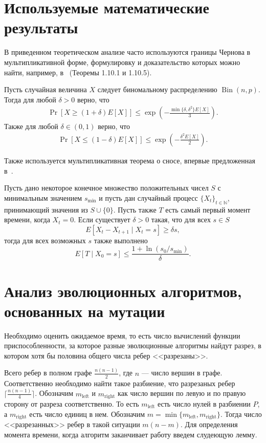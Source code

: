 \documentclass[times]{itmo-student-thesis}
\newcommand{\N}{{\mathbb N}}
\DeclareMathOperator{\Bin}{Bin}
\begin{document}
\section{Используемые математические результаты}

В приведенном теоретическом анализе часто используются границы Чернова в мультипликативной форме, формулировку и доказательство которых можно найти, например, в~\cite{Doerr20bookchapter} (Теоремы 1.10.1 и 1.10.5).

\begin{lemma}\label{lem:chernoff}
  Пусть случайная величина $X$ следует биномальному распределению $\Bin(n, p)$. Тогда для любой $\delta > 0$ верно, что
  \begin{align*}
    \Pr[X \ge (1 + \delta)E[X]] \le \exp\left(-\frac{\min\{\delta, \delta^2\}E[X]}{3}\right).
  \end{align*}
  Также для любой $\delta \in (0, 1)$ верно, что
  \begin{align*}
    \Pr[X \le (1 - \delta)E[X]] \le \exp\left(-\frac{\delta^2 E[X]}{2}\right).
  \end{align*}
\end{lemma}

Также используется мультипликативная теорема о сносе, впервые предложенная в~\cite{DoerrJW10}.

\begin{theorem}\label{thm:mult-drift}
  Пусть дано некоторое конечное множество положительных чисел $S$ с минимальным значением $s_{\min}$ и пусть дан случайный процесс $\{X_t\}_{t \in \N}$, принимающий значения из $S \cup \{0\}$. Пусть также $T$ есть самый первый момент времени, когда $X_t = 0$. Если существует $\delta > 0$ такая, что для всех $s \in S$
  \[
    E\left[X_t - X_{t + 1} \mid X_t = s\right] \ge \delta s,
  \]
  тогда для всех возможных $s$ также выполнено
  \[
    E[T \mid X_0 = s] \le \frac{1 + \ln(s_0/s_{\min})}{\delta}.
  \]
\end{theorem}

\section{Анализ эволюционных алгоритмов, основанных на мутации}
Необходимо оценить ожидаемое время, то есть число вычислений функции приспособленности, за которое разные эволюционные алгоритмы найдут разрез, в котором хотя бы половина общего числа ребер <<разрезаны>>.

Всего ребер в полном графе $\frac{n(n-1)}{2}$, где $n$ --- число вершин в графе.
Соответственно необходимо найти такое разбиение, что разрезаных ребер $\lceil \frac{n(n-1)}{4} \rceil$.
Обозначим $m_{\text{left}}$ и $m_{\text{right}}$ как число вершин по левую и по правую сторону от разреза соответственно. То есть $m_{\text{left}}$ есть число нулей в разбиении $P$, а $m_{\text{right}}$ есть число единиц в нем.
Обозначим $m = \min\{m_{\text{left}}, m_{\text{right}}\}$.
Тогда число <<разрезанных>> ребер в такой ситуации $m(n-m)$. Для определения момента времени, когда алгоритм заканчивает работу введем слудеющую лемму.
\end{document}
